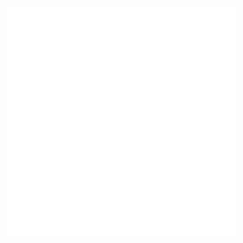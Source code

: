 \begin{figure}[]
\begin{subfigure}{\textwidth}
\begin{subfigure}{0.24\textwidth}
            \includegraphics[width=\textwidth]{images/04-experiment01/pebbles/white_bg.jpg}
        \end{subfigure}
        \hfill
        \begin{subfigure}{0.24\textwidth}
            \centering
\end{subfigure}
\end{subfigure}
\end{figure}

